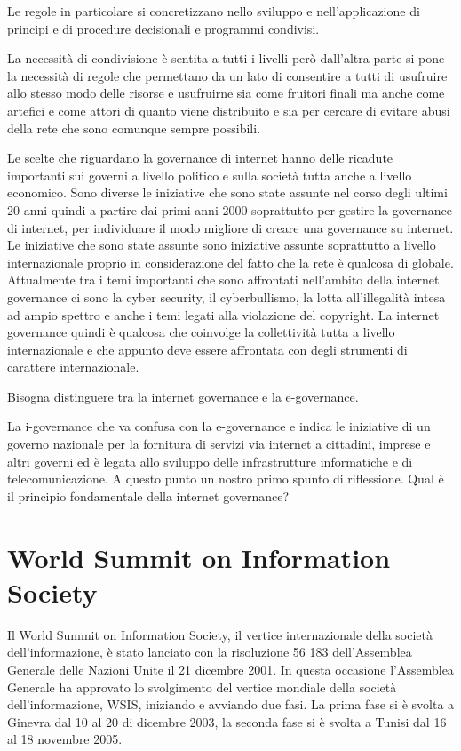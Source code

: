 Le regole in particolare si concretizzano nello sviluppo e nell'applicazione di principi e di procedure decisionali e programmi condivisi.\par 
La necessità di condivisione è sentita a tutti i livelli però  dall'altra parte si pone la necessità di regole che permettano da un lato di consentire a tutti di usufruire allo stesso modo delle risorse e usufruirne sia come fruitori finali ma anche come artefici e come attori di quanto viene distribuito e sia per cercare di evitare abusi della rete che sono comunque sempre possibili.\par
Le scelte che riguardano la governance di internet hanno delle ricadute importanti sui governi a livello politico e sulla società tutta anche a livello economico. Sono diverse le iniziative che sono state assunte nel corso degli ultimi 20 anni quindi a partire dai primi anni 2000 soprattutto per gestire la governance di internet, per individuare il modo migliore di creare una governance su internet. Le iniziative che sono state assunte sono iniziative assunte soprattutto a livello internazionale proprio in considerazione del fatto che la rete è qualcosa di globale. Attualmente tra i temi importanti che sono affrontati nell'ambito della internet governance ci sono la cyber security, il cyberbullismo, la lotta all'illegalità intesa ad ampio spettro e anche i temi legati alla violazione del copyright. La internet governance quindi è qualcosa che coinvolge la collettività tutta a livello internazionale e che appunto deve essere affrontata con degli strumenti di carattere internazionale.\par 
Bisogna distinguere tra la internet governance e la e-governance.\par 
La i-governance che  va  confusa con la e-governance e indica le iniziative di un governo nazionale per la fornitura di servizi via internet a cittadini, imprese e altri governi ed è legata allo sviluppo delle infrastrutture informatiche e di telecomunicazione. 
A questo punto un nostro primo spunto di riflessione. Qual è il principio fondamentale della internet governance? 

\section{World Summit on Information Society}
Il World Summit on Information Society, il vertice internazionale della società dell'informazione, è stato lanciato con la risoluzione 56 183 dell'Assemblea Generale delle Nazioni Unite il 21 dicembre 2001. In questa occasione l'Assemblea Generale ha approvato lo svolgimento del vertice mondiale della società dell'informazione, WSIS, iniziando e avviando due fasi. La prima fase si è svolta a Ginevra dal 10 al 20 di dicembre 2003, la seconda fase si è svolta a Tunisi dal 16 al 18 novembre 2005. 

